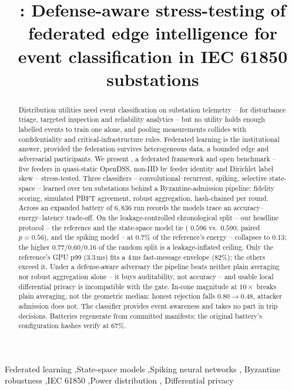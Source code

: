 \documentclass[final,3p,times,twocolumn]{elsarticle}
\begin{document}
\begin{frontmatter}

\title{\sysname: Defense-aware stress-testing of federated edge
intelligence for event classification in IEC 61850 substations}


\begin{abstract}
Distribution utilities need event classification on substation telemetry --
for disturbance triage, targeted inspection and reliability analytics --
but no utility holds enough labelled events to train one alone,
and pooling measurements collides with confidentiality and
critical-infrastructure rules. Federated learning is the institutional
answer, provided the federation survives heterogeneous data, a bounded edge
and adversarial participants. We present \sysname, a federated framework and
open benchmark -- five feeders in quasi-static OpenDSS, non-IID by
feeder identity and Dirichlet label skew -- stress-tested. Three
classifiers -- convolutional--recurrent, spiking, selective state-space --
learned over ten substations behind a Byzantine-admission pipeline:
fidelity scoring, simulated PBFT agreement, robust aggregation,
hash-chained per round. Across an expanded battery of $6{,}836$ run
records the models trace an accuracy--energy--latency trade-off. On the
leakage-controlled chronological split -- our headline protocol -- the
reference and the state-space model tie
(\macroF{} $0.596$ vs.\ $0.590$, paired $p=0.56$), and the spiking model --
at $0.7\%$ of the reference's energy -- collapses to $0.13$; the higher
$0.77/0.60/0.16$ of the random split is a leakage-inflated ceiling. Only
the reference's GPU \mbox{p99} ($3.3$\,ms) fits a $4$\,ms
fast-message envelope ($82\%$); the others exceed it. Under a defense-aware
adversary the pipeline beats neither plain averaging nor robust aggregation
alone -- it buys auditability, not accuracy -- and usable local differential
privacy is incompatible with the gate. In-cone magnitude at $10\times$
breaks plain averaging, not the geometric median: honest rejection falls
$0.80 \rightarrow 0.48$, attacker admission does not. The classifier provides
event awareness and takes no part in trip decisions. Batteries
regenerate from committed manifests; the original battery's configuration
hashes verify at $67\%$.
\end{abstract}

\begin{keyword}
Federated learning \sep State-space models \sep Spiking neural networks \sep
Byzantine robustness \sep IEC 61850 \sep Power distribution \sep
Differential privacy
\end{keyword}

\end{frontmatter}
\end{document}
